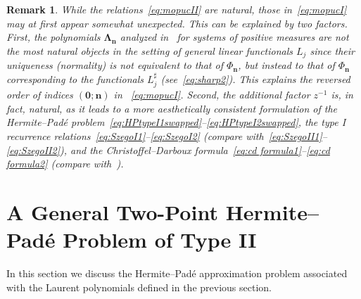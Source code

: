 \documentclass[reqno,centertags,11pt,draft]{amsart}
\newtheorem{rem}[thm]{Remark}
\begin{document}
\begin{rem}\label{rem:annoying2}
    While the relations~\eqref{eq:mopucII} are natural, those in~\eqref{eq:mopucI} may at first appear somewhat unexpected. This can be explained by two factors. First, the polynomials $\bm\Lambda_{\bm{n}}$ analyzed in~\cite{MOPUC1,MOPUC2,KVMOPUC} for systems of positive measures are not the most natural objects in the setting of general linear functionals $L_j$ since their uniqueness  (normality) is {\it not} equivalent to that of $\Phi_{\bm{n}}$, but instead to that of $\Phi_{\bm{n}}$ corresponding to the functionals $L_j^\sharp$ (see~\eqref{eq:sharp2}).
    This explains the reversed order of indices $(\bm{0};\bm{n})$ in ~\eqref{eq:mopucI}. Second, the additional factor $z^{-1}$ is, in fact, natural, as it leads to a more aesthetically consistent formulation of the Hermite--Pad\'{e} problem~\eqref{eq:HPtypeI1swapped}--\eqref{eq:HPtypeI2swapped}, the type I recurrence relations~\eqref{eq:SzegoI1}--\eqref{eq:SzegoI2} (compare with~\eqref{eq:SzegoII1}--\eqref{eq:SzegoII2}), and the Christoffel--Darboux formula~\eqref{eq:cd formula1}--\eqref{eq:cd formula2} (compare with~\cite[Thm 6.1]{KVMOPUC}). 
\end{rem}


\section{A General Two-Point Hermite--Pad\'e Problem of Type II}\label{ss:general type II hermite pade}


In this section we discuss the Hermite--Pad\'{e} approximation problem associated with the Laurent polynomials defined in the previous section.  
\end{document}
